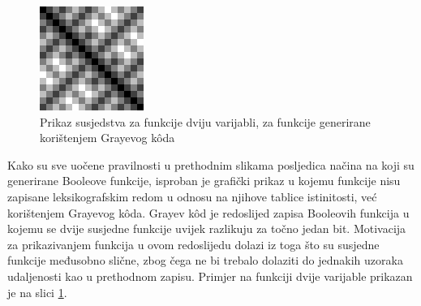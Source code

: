 \begin{figure}[ht!] 
    \centering
    \includegraphics[width=.4\textwidth]{img/function_gray_2}
    \captionsetup{justification=centering}
    \caption{Prikaz susjedstva za funkcije dviju varijabli, za funkcije generirane korištenjem Grayevog k\^oda}
    \label{fig:function_gray_2}
\end{figure}
Kako su sve uočene pravilnosti u prethodnim slikama posljedica načina na koji su generirane Booleove funkcije, isproban je grafički prikaz u kojemu funkcije nisu zapisane leksikografskim redom u odnosu na njihove tablice istinitosti, već korištenjem Grayevog k\^oda.
Grayev k\^od je redoslijed zapisa Booleovih funkcija u kojemu se dvije susjedne funkcije uvijek razlikuju za točno jedan bit. 
Motivacija za prikazivanjem funkcija u ovom redoslijedu dolazi iz toga što su susjedne funkcije međusobno slične, zbog čega ne bi trebalo dolaziti do jednakih uzoraka udaljenosti kao u prethodnom zapisu.
Primjer na funkciji dvije varijable prikazan je na slici \ref{fig:function_gray_2}.

